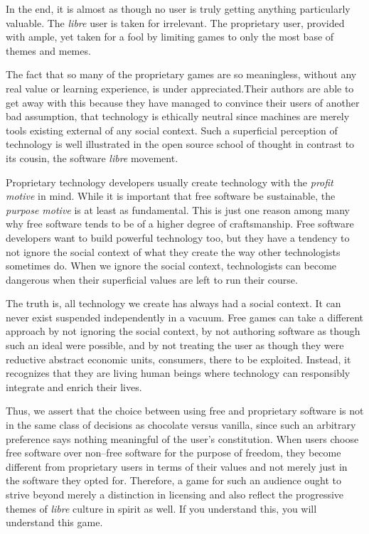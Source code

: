 In the end, it is almost as though no user is truly getting anything particularly valuable. The {\it libre} user is taken for irrelevant. The proprietary user, provided with ample, yet taken for a fool by limiting games to only the most base of themes and memes.

The fact that so many of the proprietary games are so meaningless, without any real value or learning experience, is under appreciated. Their authors are able to get away with this because they have managed to convince their users of another bad assumption, that technology is ethically neutral since machines are merely tools existing external of any social context. Such a superficial perception of technology is well illustrated in the open source school of thought in contrast to its cousin, the software {\it libre} movement. 

Proprietary technology developers usually create technology with the {\it profit motive} in mind. While it is important that free software be sustainable, the {\it purpose motive} is at least as fundamental. This is just one reason among many why free software tends to be of a higher degree of craftsmanship. Free software developers want to build powerful technology too, but they have a tendency to not ignore the social context of what they create the way other technologists sometimes do. When we ignore the social context, technologists can become dangerous when their superficial values are left to run their course.\footnotecite[black2012]\footnotecite[brew2012]

The truth is, all technology we create has always had a social context. It can never exist suspended independently in a vacuum. Free games can take a different approach by not ignoring the social context, by not authoring software as though such an ideal were possible, and by not treating the user as though they were reductive abstract economic units, consumers, there to be exploited. Instead, it recognizes that they are living human beings where technology can responsibly integrate and enrich their lives. 

Thus, we assert that the choice between using free and proprietary software is not in the same class of decisions as chocolate versus vanilla, since such an arbitrary preference says nothing meaningful of the user's constitution. When users choose free software over non--free software for the purpose of freedom, they become different from proprietary users in terms of their values and not merely just in the software they opted for. Therefore, a game for such an audience ought to strive beyond merely a distinction in licensing and also reflect the progressive themes of {\it libre} culture in spirit as well. If you understand this, you will understand this game.


